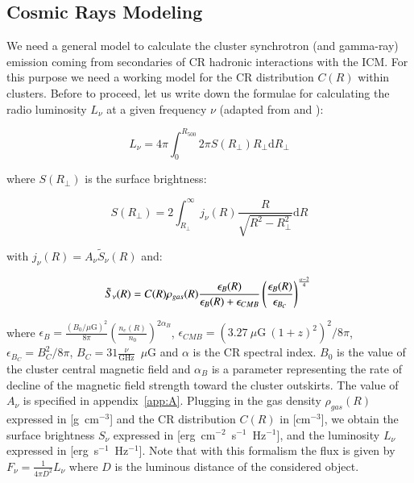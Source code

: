 \documentclass[traditabstract]{aa}
\newcommand{\rmn}{\mathrm}
\begin{document}
\subsection{Cosmic Rays Modeling}
\label{sec:2.3}
We need a general model to calculate the cluster synchrotron (and gamma-ray) emission coming from secondaries of CR hadronic interactions with the ICM. For this purpose we need a working model for the CR distribution $C(R)$ within clusters. Before to proceed, let us write down the formulae for calculating the radio luminosity $L_{\nu}$ at a given frequency $\nu$ (adapted from \citealp{2008MNRAS.385.1211P} and \citealp{2011A&A...527A..99E}):

\begin{equation}
L_{\nu} = 4\pi \int_{0}^{R_{500}} 2\pi S(R_{\perp}) R_{\perp} \rmn{d}R_{\perp}
\label{eq:luminosity}
\end{equation}

where $S(R_{\perp})$ is the surface brightness:

\begin{equation}
S(R_{\perp}) = 2 \int_{R_{\perp}}^{\infty} j_{\nu}(R) \frac{R}{\sqrt{R^{2}-R_{\perp}^{2}}} \rmn{d}R
\label{eq:surface_brightness_1}
\end{equation}

with $ j_{\nu}(R)=A_{\nu}\tilde{S}_{\nu}(R)$ and:

\begin{equation}
\tilde{S}_{\nu}(R)  =  C(R) \rho_{gas}(R) \frac{\epsilon_{B}(R)}{\epsilon_{B}(R)+\epsilon_{CMB}} \left( \frac{\epsilon_{B}(R)}{\epsilon_{B_{C}}} \right)^{\frac{\alpha-2}{4}} \\
\label{eq:surface_brightness_2}
\end{equation}

where $\epsilon_{B}=\frac{(B_{0}/\mu\rmn{G})^{2}}{8\pi}\left(\frac{n_{e}(R)}{n_{0}}\right)^{2\alpha_{B}}$, $\epsilon_{CMB}=(3.27~\mu\rmn{G}~(1+z)^{2})^{2}/8\pi$, $\epsilon_{B_{C}}=B_{C}^{2}/8\pi$, $B_{C}=31\frac{\nu}{\rmn{GHz}}$~$\mu$G and $\alpha$ is the CR spectral index. $B_{0}$ is the value of the cluster central magnetic 
field and $\alpha_{B}$ is a parameter representing the rate of decline of the magnetic field strength toward the cluster outskirts. The value of $A_{\nu}$ is specified in appendix~\ref{app:A}. Plugging in the gas density $\rho_{gas}(R)$ expressed in [g~cm$^{-3}$] and the CR distribution $C(R)$ in [cm$^{-3}$], we obtain the surface brightness $S_{\nu}$ expressed in [erg~cm$^{-2}$~s$^{-1}$~Hz$^{-1}$], and the luminosity $L_{\nu}$ expressed in [erg~s$^{-1}$~Hz$^{-1}$]. Note that with this formalism the flux is given by $F_{\nu}=\frac{1}{4\pi D^{2}}L_{\nu}$ where $D$ is the luminous distance of the considered object.
\end{document}

